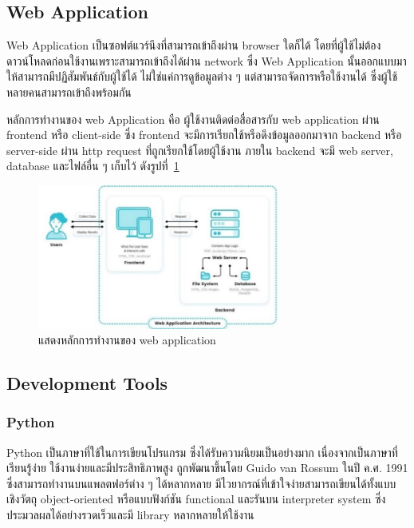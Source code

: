 \documentclass[12pt,oneside,openright,a4paper]{cpe-thai-project}
\begin{document}
\newpage

\subsection{Web Application}
\par\setlength{\parindent}{5ex}
Web Application เป็นซอฟต์แวร์นึงที่สามารถเข้าถึงผ่าน browser ใดก็ได้ โดยที่ผู้ใช้ไม่ต้องดาวน์โหลดก่อนใช้งานเพราะสามารถเข้าถึงได้ผ่าน network ซึ่ง Web Application นั้นออกแบบมาให้สามารถมีปฏิสัมพันธ์กับผู้ใช้ได้ ไม่ใช่แค่การดูข้อมูลต่าง ๆ แต่สามารถจัดการหรือใช้งานได้ ซึ่งผู้ใช้หลายคนสามารถเข้าถึงพร้อมกัน
\par\setlength{\parindent}{5ex}
หลักการทำงานของ web Application คือ ผู้ใช้งานติดต่อสื่อสารกับ web application ผ่าน frontend หรือ client-side ซึ่ง frontend จะมีการเรียกใช้หรือดึงข้อมูลออกมาจาก backend หรือ server-side ผ่าน http request ที่ถูกเรียกใช้โดยผู้ใช้งาน ภายใน backend จะมี web server, database 
และไฟล์อื่น ๆ เก็บไว้ ดังรูปที่~\ref{fig:webapp} 

\newpage
\begin{figure}[!h]
  \centering
  \includegraphics[width=8cm]{./image/webapp.jpg}
  \caption{แสดงหลักการทำงานของ web application}
  \label{fig:webapp}
\end{figure}

\subsection{Development Tools}
\subsubsection{Python}
\par\setlength{\parindent}{5ex}
Python เป็นภาษาที่ใช้ในการเขียนโปรแกรม ซึ่งได้รับความนิยมเป็นอย่างมาก เนื่องจากเป็นภาษาที่เรียนรู้ง่าย ใช้งานง่ายและมีประสิทธิภาพสูง ถูกพัฒนาขึ้นโดย Guido van Rossum ในปี ค.ศ. 1991 ซึ่งสามารถทำงานบนแพลตฟอร์ต่าง ๆ ได้หลากหลาย มีไวยากรณ์ที่เข้าใจง่ายสามารถเขียนได้ทั้งแบบเชิงวัตถุ object-oriented หรือแบบฟังก์ชัน functional และรันบน interpreter system ซึ่งประมวลผลได้อย่างรวดเร็วและมี library หลากหลายให้ใช้งาน
\end{document}
